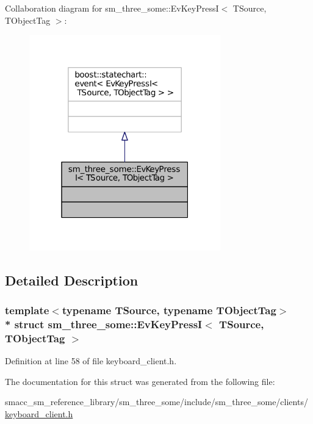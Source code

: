 Collaboration diagram for sm\+\_\+three\+\_\+some\+:\+:Ev\+Key\+PressI$<$ T\+Source, T\+Object\+Tag $>$\+:
\nopagebreak
\begin{figure}[H]
\begin{center}
\leavevmode
\includegraphics[width=235pt]{structsm__three__some_1_1EvKeyPressI__coll__graph}
\end{center}
\end{figure}


\subsection{Detailed Description}
\subsubsection*{template$<$typename T\+Source, typename T\+Object\+Tag$>$\\*
struct sm\+\_\+three\+\_\+some\+::\+Ev\+Key\+Press\+I$<$ T\+Source, T\+Object\+Tag $>$}



Definition at line 58 of file keyboard\+\_\+client.\+h.



The documentation for this struct was generated from the following file\+:\begin{DoxyCompactItemize}
\item 
smacc\+\_\+sm\+\_\+reference\+\_\+library/sm\+\_\+three\+\_\+some/include/sm\+\_\+three\+\_\+some/clients/\hyperlink{keyboard__client_8h}{keyboard\+\_\+client.\+h}\end{DoxyCompactItemize}
